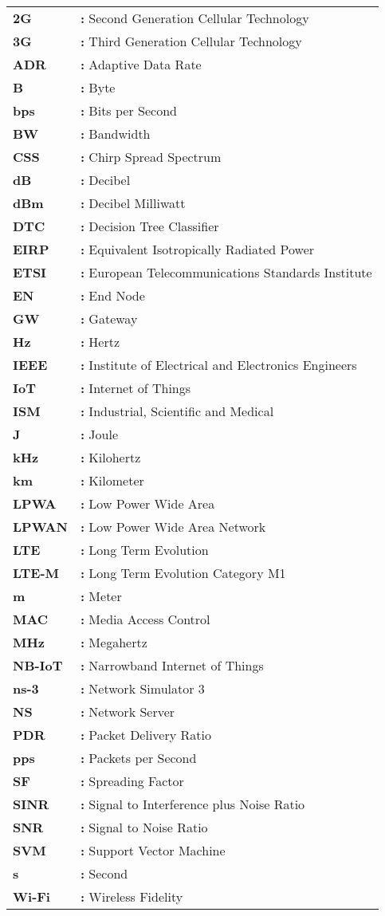 \hspace{-3mm}
\begin{tabular}{p{2cm}l}
{\bf 2G} & {\bf:} Second Generation Cellular Technology\\
{\bf 3G} & {\bf:} Third Generation Cellular Technology\\
{\bf ADR} & {\bf:} Adaptive Data Rate\\
{\bf B} & {\bf:} Byte\\
{\bf bps} & {\bf:} Bits per Second\\
{\bf BW} & {\bf:} Bandwidth\\
{\bf CSS} & {\bf:} Chirp Spread Spectrum\\
{\bf dB} & {\bf:} Decibel\\
{\bf dBm} & {\bf:} Decibel Milliwatt\\
{\bf DTC} & {\bf:} Decision Tree Classifier\\
{\bf EIRP} & {\bf:} Equivalent Isotropically Radiated Power\\
{\bf ETSI} & {\bf:} European Telecommunications Standards Institute\\
{\bf EN} & {\bf:} End Node\\
{\bf GW} & {\bf:} Gateway\\
{\bf Hz} & {\bf:} Hertz\\
{\bf IEEE} & {\bf:} Institute of Electrical and Electronics Engineers\\
{\bf IoT} & {\bf:} Internet of Things\\
{\bf ISM} & {\bf:} Industrial, Scientific and Medical\\
{\bf J} & {\bf:} Joule\\
{\bf kHz} & {\bf:} Kilohertz\\
{\bf km} & {\bf:} Kilometer\\
{\bf LPWA} & {\bf:} Low Power Wide Area\\
{\bf LPWAN} & {\bf:} Low Power Wide Area Network\\
{\bf LTE} & {\bf:} Long Term Evolution\\
{\bf LTE-M} & {\bf:}  Long Term Evolution Category M1\\
{\bf m} & {\bf:} Meter\\
{\bf MAC} & {\bf:} Media Access Control\\
{\bf MHz} & {\bf:} Megahertz\\
{\bf NB-IoT} & {\bf:} Narrowband Internet of Things\\
{\bf ns-3} & {\bf:} Network Simulator 3\\
{\bf NS} & {\bf:} Network Server\\
{\bf PDR} & {\bf:} Packet Delivery Ratio\\
{\bf pps} & {\bf:} Packets per Second\\
{\bf SF} & {\bf:} Spreading Factor\\
{\bf SINR} & {\bf:} Signal to Interference plus Noise Ratio\\
{\bf SNR} & {\bf:} Signal to Noise Ratio\\
{\bf SVM} & {\bf:} Support Vector Machine\\
{\bf s} & {\bf:} Second\\
{\bf Wi-Fi} & {\bf:} Wireless Fidelity\\
\end{tabular}
